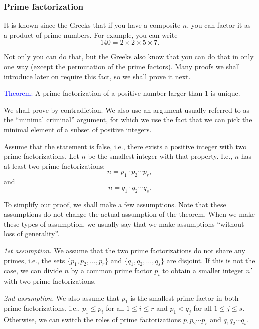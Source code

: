 \begin{frame}\frametitle{Prime factorization}
  It is known since the Greeks that if you have a composite $n$, you
  can factor it as a product of prime numbers.  For example, you can
  write
  \[ 140 = 2\times 2\times 5\times 7. \]

  \vspace{0.1in} Not only you can do that, but the Greeks also know
  that you can do that in only one way (except the permutation of the
  prime factors).  Many proofs we shall introduce later on require
  this fact, so we shall prove it next.
\end{frame}

\begin{frame}
  \textcolor{blue}{Theorem:} A prime factorization of a positive
  number larger than 1 is unique.

  \begin{tcolorbox}[title=Proof]
  We shall prove by contradiction.  We also
  use an argument usually referred to as the ``minimal criminal''
  argument, for which we use the fact that we can pick the minimal
  element of a subset of positive integers.

  \vspace{0.1in}
  Assume that the statement is false, i.e., there exists a positive
  integer with two prime factorizations.  Let $n$ be the smallest
  integer with that property.  I.e., $n$ has at least two prime
  factorizations:
  \[ n = p_1 \cdot p_2 \cdots p_r, \]
  and
  \[ n = q_1 \cdot q_2 \cdots q_s.\]
  \end{tcolorbox}
\end{frame}

\begin{frame}
  \begin{tcolorbox}[title=Proof (cont.)]
  To simplify our proof, we shall make a few assumptions.  Note that
  these assumptions do not change the actual assumption of the
  theorem.  When we make these types of assumption, we usually say
  that we make assumptions ``without loss of generality''.

  \vspace{0.1in} {\em 1st assumption.} We assume that the two prime
  factorizations do not share any primes, i.e., the sets
  $\{p_1,p_2,\ldots,p_r\}$ and $\{q_1,q_2,\ldots,q_s\}$ are disjoint.
  If this is not the case, we can divide $n$ by a common prime factor
  $p_i$ to obtain a smaller integer $n'$ with two prime
  factorizations.

  \vspace{0.1in} {\em 2nd assumption.} We also assume that $p_1$ is
  the smallest prime factor in both prime factorizations, i.e.,
  $p_1\leq p_i$ for all $1\leq i\leq r$ and $p_1 < q_j$ for all $1\leq
  j\leq s$.  Otherwise, we can switch the roles of prime
  factorizations $p_1p_2\cdots p_r$ and $q_1q_2\cdots q_s$.
  \end{tcolorbox}
\end{frame}


